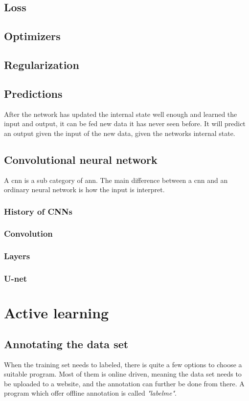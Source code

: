 \documentclass[USenglish]{ifimaster}  %
\begin{document}
\subsection{Loss}
\subsection{Optimizers}
\subsection{Regularization}
\subsection{Predictions}
After the network has updated the internal state well enough and learned the input and output, it can be fed new data it has never seen before. It will predict an output given the input of the new data, given the networks internal state.  
\subsection{Convolutional neural network}
A \ac{cnn} is a sub category of \ac{ann}. The main difference between a \ac{cnn} and an ordinary neural network is how the input is interpret. 
\subsubsection{History of CNNs}
\subsubsection{Convolution}
\subsubsection{Layers}
\subsubsection{U-net}
\section{Active learning}
\subsection{Annotating the data set}
When the training set needs to labeled, there is quite a few options to choose a suitable program. Most of them is online driven, meaning the data set needs to be uploaded to a website, and the annotation can further be done from there. A program which offer offline annotation is called \textit{"labelme"}\cite{website:labelme}. 
\end{document}
